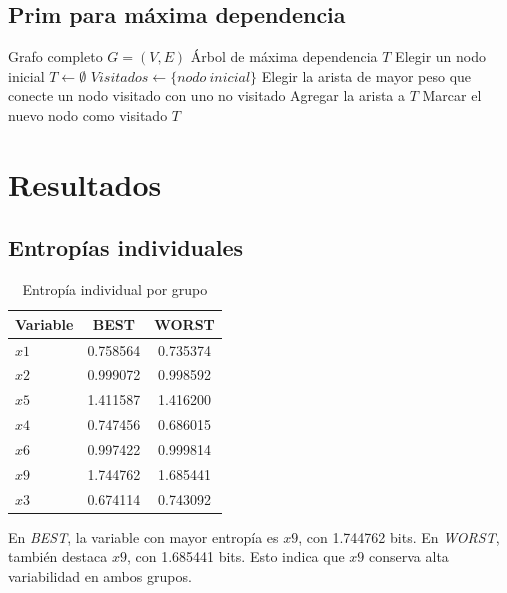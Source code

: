 \documentclass[12pt,a4paper]{article}
\begin{document}
\subsection{Prim para máxima dependencia}

\begin{algorithm}[H]
\caption{Prim para árbol de máxima dependencia}
\begin{algorithmic}[1]
\Require Grafo completo \(G=(V,E)\)
\Ensure Árbol de máxima dependencia \(T\)
\State Elegir un nodo inicial
\State \(T \gets \emptyset\)
\State \(Visitados \gets \{nodo\ inicial\}\)
    \State Elegir la arista de mayor peso que conecte un nodo visitado con uno no visitado
    \State Agregar la arista a \(T\)
    \State Marcar el nuevo nodo como visitado
\EndWhile
\State \Return \(T\)
\end{algorithmic}
\end{algorithm}

\section{Resultados}

\subsection{Entropías individuales}

\begin{table}[H]
\centering
\caption{Entropía individual por grupo}
\label{tab:entropias}
\begin{tabular}{lcc}
\toprule
\textbf{Variable} & \textbf{BEST} & \textbf{WORST} \\
\midrule
\(x1\) & 0.758564 & 0.735374 \\
\(x2\) & 0.999072 & 0.998592 \\
\(x5\) & 1.411587 & 1.416200 \\
\(x4\) & 0.747456 & 0.686015 \\
\(x6\) & 0.997422 & 0.999814 \\
\(x9\) & 1.744762 & 1.685441 \\
\(x3\) & 0.674114 & 0.743092 \\
\bottomrule
\end{tabular}
\end{table}

En \textit{BEST}, la variable con mayor entropía es \(x9\), con 1.744762 bits. En \textit{WORST}, también destaca \(x9\), con 1.685441 bits. Esto indica que \(x9\) conserva alta variabilidad en ambos grupos.
\end{document}
